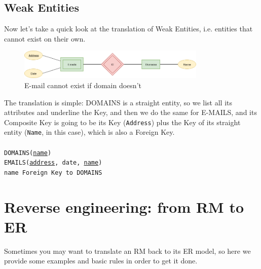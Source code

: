 \documentclass[class=book, crop=false, oneside]{standalone}
\newcommand\tab[1][1cm]{\hspace*{#1}}
\begin{document}
\section{Weak Entities}
Now let's take a quick look at the translation of Weak Entities, i.e. entities that cannot exist on their own.\\
\begin{figure}[H]
	\includegraphics[width=0.8\textwidth,keepaspectratio]{diagram4_00.png}
	\caption{E-mail cannot exist if domain doesn't}
	\label{diagram4_00}
\end{figure}
\vskip 5pt
The translation is simple: DOMAINS is a straight entity, so we list all its attributes and underline the Key, and then we do the same for E-MAILS, and its Composite Key is going to be its Key (\texttt{Address}) plus the Key of its straight entity (\texttt{Name}, in this case), which is also a Foreign Key.\\\\
\texttt{DOMAINS(\underline{name})}\\
\texttt{EMAILS(\underline{address}, date, \underline{name})}\\
\tab[.4cm] \texttt{name Foreign Key to DOMAINS}
\vskip 5pt

\chapter{Reverse engineering: from RM to ER}
Sometimes you may want to translate an RM back to its ER model, so here we provide some examples and basic rules in order to get it done.
\end{document}
